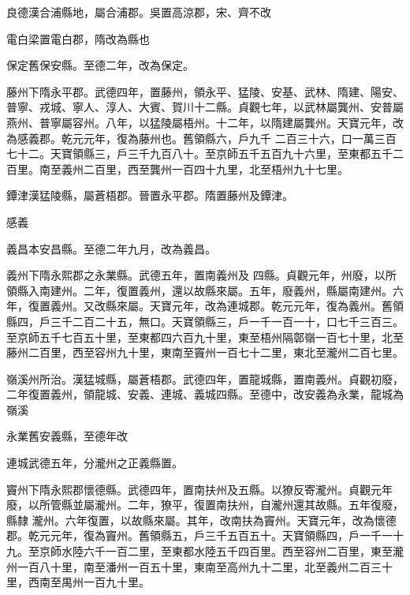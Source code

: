 \begin{pinyinscope}
 良德漢合浦縣地，屬合浦郡。吳置高涼郡，宋、齊不改



 電白梁置電白郡，隋改為縣也



 保定舊保安縣。至德二年，改為保定。



 藤州下隋永平郡。武德四年，置藤州，領永平、猛陵、安基、武林、隋建、陽安、普寧、戎城、寧人、淳人、大賓、賀川十二縣。貞觀七年，以武林屬龔州、安普屬燕州、普寧屬容州。八年，以猛陵屬梧州。十二年，以隋建屬龔州。天寶元年，改為感義郡。乾元元年，復為藤州也。舊領縣六，戶九千
 二百三十六，口一萬三百七十二。天寶領縣三，戶三千九百八十。至京師五千五百九十六里，至東都五千二百里。南至義州二百里，西至龔州一百四十九里，北至梧州九十七里。



 鐔津漢猛陵縣，屬蒼梧郡。晉置永平郡。隋置藤州及鐔津。



 感義



 義昌本安昌縣。至德二年九月，改為義昌。



 義州下隋永熙郡之永業縣。武德五年，置南義州及
 四縣。貞觀元年，州廢，以所領縣入南建州。二年，復置義州，還以故縣來屬。五年，廢義州，縣屬南建州。六年，復置義州。又改縣來屬。天寶元年，改為連城郡。乾元元年，復為義州。舊領縣四，戶三千二百二十五，無口。天寶領縣三，戶一千一百一十，口七千三百三。至京師五千七百五十里，至東都四六百九十里，東至梧州隔鄣嶺一百七十里，北至藤州二百里，西至容州九十里，東南至竇州一百七十二里，東北至瀧州二百七里。



 嶺溪州所治。漢猛城縣，屬蒼梧郡。武德四年，置龍城縣，置南義州。貞觀初廢，二年復置義州，領龍城、安義、連城、義城四縣。至德中，改安義為永業，龍城為嶺溪



 永業舊安義縣，至德年改



 連城武德五年，分瀧州之正義縣置。



 竇州下隋永熙郡懷德縣。武德四年，置南扶州及五縣。以獠反寄瀧州。貞觀元年廢，以所管縣並屬瀧州。二年，獠平，復置南扶州，自瀧州還其故縣。五年復廢，縣隸
 瀧州。六年復置，以故縣來屬。其年，改南扶為竇州。天寶元年，改為懷德郡。乾元元年，復為竇州。舊領縣五，戶三千五百五十。天寶領縣四，戶一千一十九。至京師水陸六千一百二里，至東都水陸五千四百里。西至容州二百里，東至瀧州一百八十里，南至潘州一百五十里，東南至高州九十二里，北至義州二百三十里，西南至禺州一百九十里。




\end{pinyinscope}
